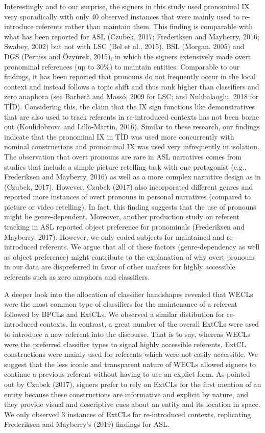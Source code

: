 \documentclass[]{elsarticle} %
\begin{document}
Interestingly and to our surprise, the signers in this study used
pronominal IX very sporadically with only 40 observed instances that
were mainly used to re-introduce referents rather than maintain them.
This finding is comparable with what has been reported for ASL (Czubek,
2017; Frederiksen and Mayberry, 2016; Swabey, 2002) but not with LSC
(Bel et al., 2015), BSL (Morgan, 2005) and DGS (Perniss and Özyürek,
2015), in which the signers extensively made overt pronominal references
(up to 30\%) to maintain entities. Comparable to our findings, it has
been reported that pronouns do not frequently occur in the local context
and instead follows a topic shift and thus rank higher than classifiers
and zero anaphora (see Barberà and Massó, 2009 for LSC; and Nuhbalaoglu,
2018 for TİD). Considering this, the claim that the IX sign functions
like demonstratives that are also used to track referents in
re-introduced contexts has not been borne out (Koulidobrova and
Lillo-Martin, 2016). Similar to these research, our findings indicate
that the pronominal IX in TİD was used more concurrently with nominal
constructions and pronominal IX was used very infrequently in isolation.
The observation that overt pronouns are rare in ASL narratives comes
from studies that include a simple picture retelling task with one
protagonist (e.g., Frederiksen and Mayberry, 2016) as well as a more
complex narrative design as in (Czubek, 2017). However, Czubek (2017)
also incorporated different genres and reported more instances of overt
pronouns in personal narratives (compared to picture or video
retelling). In fact, this finding suggests that the use of pronouns
might be genre-dependent. Moreover, another production study on referent
tracking in ASL reported object preference for pronominals (Frederiksen
and Mayberry, 2017). However, we only coded subjects for maintained and
re-introduced referents. We argue that all of these factors
(genre-dependency as well as object preference) might contribute to the
explanation of why overt pronouns in our data are dispreferred in favor
of other markers for highly accessible referents such as zero anaphora
and classifiers.

A deeper look into the allocation of classifier handshapes revealed that
WECLs were the most common type of classifiers for the maintenance of a
referent followed by BPCLs and ExtCLs. We observed a similar distibution
for re-introduced contexts. In contrast, a great number of the overall
ExtCLs were used to introduce a new referent into the discourse. That is
to say, whereas WECLs were the preferred classifier types to signal
highly accessible referents, ExtCL constructions were mainly used for
referents which were not easily accessible. We suggest that the less
iconic and transparent nature of WECLs allowed signers to continue a
previous referent without having to use an explict form. As pointed out
by Czubek (2017), signers prefer to rely on ExtCLs for the first mention
of an entity because these constructions are informative and explicit by
nature, and they provide visual and descriptive cues about an entity and
its location in space. We only observed 3 instances of ExtCLs for
re-introduced contexts, replicating Frederiksen and Mayberry's (2019)
findings for ASL.
\end{document}
